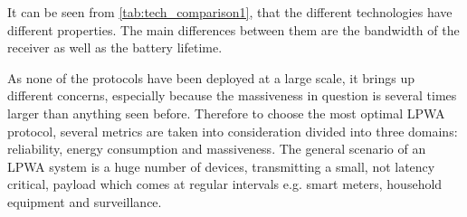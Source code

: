 
It can be seen from \autoref{tab:tech_comparison1}, that the different technologies have different properties. The main differences between them are the bandwidth of the receiver as well as the battery lifetime. 

As none of the protocols have been deployed at a large scale, it brings up different concerns, especially because the massiveness in question is several times larger than anything seen before. Therefore to choose the most optimal LPWA protocol, several metrics are taken into consideration divided into three domains: reliability, energy consumption and massiveness. The general scenario of an LPWA system is a huge number of devices, transmitting a small, not latency critical, payload which comes at regular intervals e.g. smart meters, household equipment and surveillance. 

